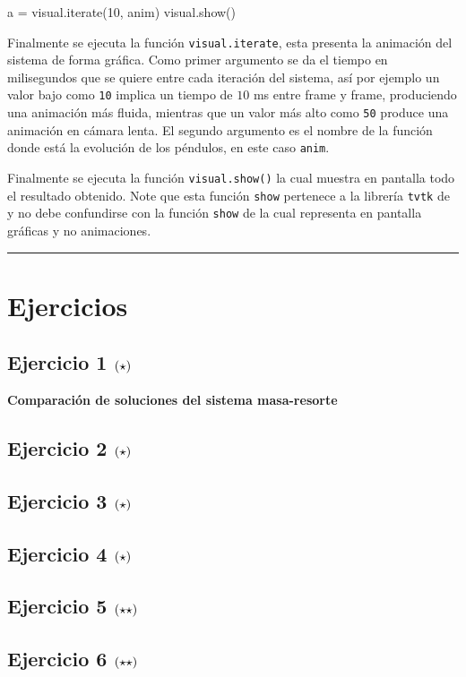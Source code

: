 \begin{listing}[style=python, numbers = none]
a = visual.iterate(10, anim)
visual.show()
\end{listing}
Finalmente se ejecuta la función \texttt{visual.iterate}, esta presenta
la animación del sistema de forma gráfica. Como primer argumento se da el 
tiempo en milisegundos que se quiere entre cada iteración del sistema, así
por ejemplo un valor bajo como \texttt{10} implica un tiempo de $10$ ms 
entre frame y frame, produciendo una animación más fluida, mientras que un
valor más alto como \texttt{50} produce una animación en cámara lenta. El 
segundo argumento es el nombre de la función donde está la evolución de los
péndulos, en este caso \texttt{anim}.


Finalmente se ejecuta la función \texttt{visual.show()} la cual muestra en 
pantalla todo el resultado obtenido. Note que esta función \texttt{show} 
pertenece a la librería \texttt{tvtk} de \mayavi y no debe confundirse con
la función \texttt{show} de \matplotlib la cual representa en pantalla 
gráficas y no animaciones.

\rule{14cm}{0.5mm}



\newpage
\section{Ejercicios}
\label{sec:ejercicios}

\subsection*{Ejercicio 1 \large{$\left( \star \right)$}}

\textbf{Comparación de soluciones del sistema masa-resorte}




\subsection*{Ejercicio 2 \large{$\left( \star \right)$}}

\subsection*{Ejercicio 3 \large{$\left( \star \right)$}}

\subsection*{Ejercicio 4 \large{$\left( \star \right)$}}

\subsection*{Ejercicio 5 \large{$\left( \star \star \right)$}}

\subsection*{Ejercicio 6 \large{$\left( \star \star \right)$}}

